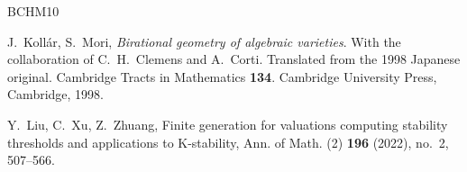 \documentclass[12pt]{amsart}
\theoremstyle{definition}
\begin{document}
\begin{thebibliography}{BCHM10}







 J.~Koll\'ar, S.~Mori, {\em{Birational geometry of algebraic varieties}}. With the collaboration of C.~H.~Clemens and A.~Corti. Translated from the 1998 Japanese original. Cambridge Tracts in Mathematics {\textbf{134}}. Cambridge University Press, Cambridge, 1998.





 Y.~Liu, C.~Xu, Z.~Zhuang, Finite generation for valuations computing stability thresholds and applications to K-stability, Ann. of Math. (2) {\textbf{196}} (2022), no.~2, 507--566. 



\end{thebibliography}
\end{document}
